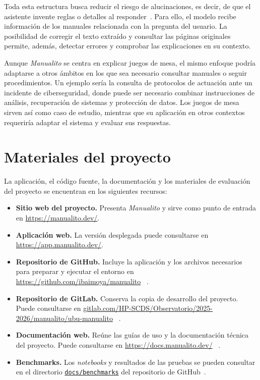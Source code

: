 Toda esta estructura busca reducir el riesgo de alucinaciones, es decir,
de que el asistente invente reglas o detalles al
responder~\cite{kalai2025hallucinate}. Para ello, el modelo recibe
información de los manuales relacionada con la pregunta del usuario.
La posibilidad de corregir el texto extraído y consultar las páginas
originales permite, además, detectar errores y comprobar las
explicaciones en su contexto.

Aunque \textit{Manualito} se centra en explicar juegos de mesa, el mismo enfoque
podría adaptarse a otros ámbitos en los que sea necesario consultar manuales
o seguir procedimientos. Un ejemplo sería la consulta de protocolos de
actuación ante un incidente de ciberseguridad, donde puede ser necesario
combinar instrucciones de análisis, recuperación de sistemas y protección
de datos. Los juegos de mesa sirven así como caso de estudio, mientras que
su aplicación en otros contextos requeriría adaptar el sistema y evaluar
sus respuestas.

\section{Materiales del proyecto}
\label{intro:materiales}

La aplicación, el código fuente, la documentación y los materiales de
evaluación del proyecto se encuentran en los siguientes recursos:

\begin{itemize}
    \item \textbf{Sitio web del proyecto.}
    Presenta \textit{Manualito} y sirve como punto de entrada en
    \url{https://manualito.dev/}.

    \item \textbf{Aplicación web.}
    La versión desplegada puede consultarse en
    \url{https://app.manualito.dev/}.

    \item \textbf{Repositorio de GitHub.}
    Incluye la aplicación y los archivos necesarios para preparar y ejecutar
    el entorno en \url{https://github.com/ibaimoya/manualito}
    ~\cite{manualito_repositorio}.

    \item \textbf{Repositorio de GitLab.}
    Conserva la copia de desarrollo del proyecto. Puede consultarse en
    \href{https://gitlab.com/HP-SCDS/Observatorio/2025-2026/manualito/ubu-manualito}
    {\url{gitlab.com/HP-SCDS/Observatorio/2025-2026/manualito/ubu-manualito}}
    ~\cite{manualito_gitlab}.

    \item \textbf{Documentación web.}
    Reúne las guías de uso y la documentación técnica del proyecto.
    Puede consultarse en \url{https://docs.manualito.dev/}
    ~\cite{manualito_documentacion}.

    \item \textbf{Benchmarks.}
    Los \textit{notebooks} y resultados de las pruebas se pueden consultar en el
    directorio \href{https://github.com/ibaimoya/manualito/tree/master/docs/benchmarks}
    {\texttt{docs/benchmarks}} del repositorio de GitHub~\cite{manualito_benchmarks}.
\end{itemize}
